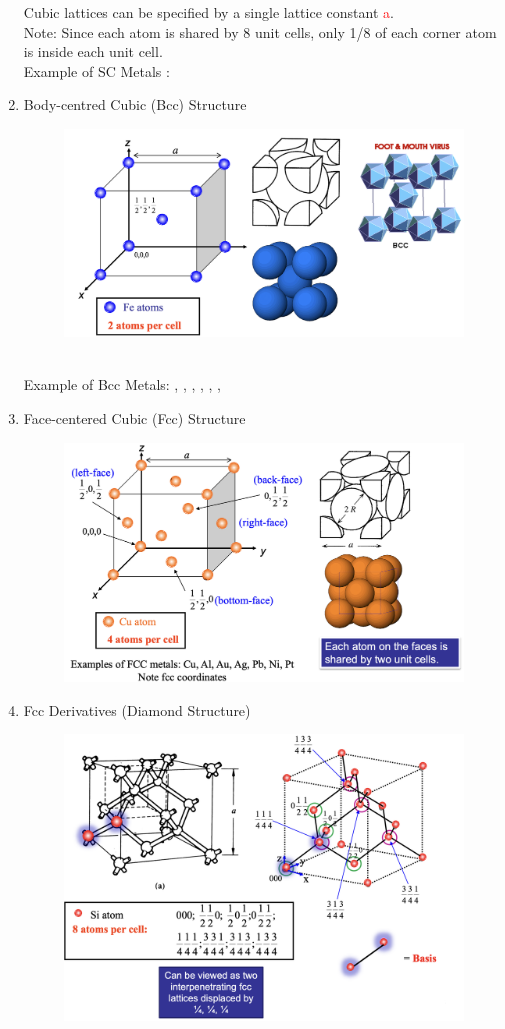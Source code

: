 \documentclass{article}
\begin{document}
\begin{enumerate}
\begin{figure}[h]
    \end{figure}
    Cubic lattices can be specified by a single lattice constant \textcolor{red}{a}. \\
    Note: Since each atom is shared by 8 unit cells, only 1/8 of each corner atom is inside each unit cell. \\
    Example of SC Metals : 
    \item Body-centred Cubic (Bcc) Structure
    \begin{figure}[h]
        \centering
        \includegraphics[width=0.75\linewidth]{image/bcc.png}
    \end{figure} \\
    Example of Bcc Metals: , , , , , , 
    \newpage
    \item Face-centered Cubic (Fcc) Structure 
    \begin{figure}[h]
        \centering
        \includegraphics[width=0.75\linewidth]{image/fcc.png}
    \end{figure}
    \item Fcc Derivatives (Diamond Structure) 
    \begin{figure}[h]
        \centering
        \includegraphics[width=0.75\linewidth]{image/diamondsturc.png}

\end{figure}
\end{enumerate}
\end{document}
